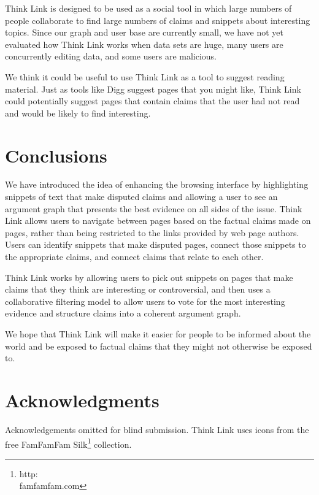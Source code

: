 \documentclass{chi2009}
\newcommand{\todo}[1]{}
\begin{document}
Think Link is designed to be used as a social tool in which large numbers of people collaborate to find large numbers of claims and snippets about interesting topics. Since our graph and user base are currently small, we have not yet evaluated how Think Link works when data sets are huge, many users are concurrently editing data, and some users are malicious.

We think it could be useful to use Think Link as a tool to suggest reading material. Just as tools like Digg suggest pages that you might like, Think Link could potentially suggest pages that contain claims that the user had not read and would be likely to find interesting.

\section{Conclusions}

We have introduced the idea of enhancing the browsing interface by highlighting snippets of text that make disputed claims and allowing a user to see an argument graph that presents the best evidence on all sides of the issue. Think Link allows users to navigate between pages based on the factual claims made on pages, rather than being restricted to the links provided by web page authors. 
Users can identify snippets that make disputed pages, connect those snippets to the appropriate claims, and connect claims that relate to each other.

Think Link works by allowing users to pick out snippets on pages that make claims that they think are interesting or controversial, and then uses a collaborative filtering model to allow users to vote for the most interesting evidence and structure claims into a coherent argument graph.

We hope that Think Link will make it easier for people to be informed about the world and be exposed to factual claims that they might not otherwise be exposed to.

\section{Acknowledgments}

Acknowledgements omitted for blind submission. Think Link uses icons from the free FamFamFam Silk\footnote{http:\\famfamfam.com} collection.


\todo{Sort out bad references}

\end{document}

